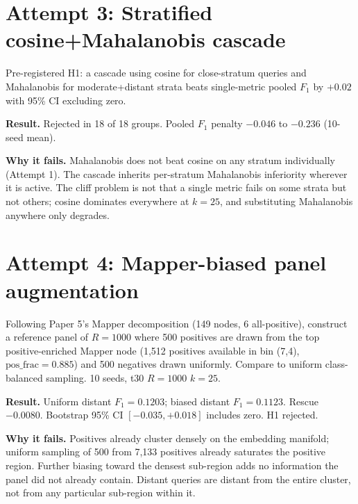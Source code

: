 \documentclass[11pt]{article}
\begin{document}
\section{Attempt 3: Stratified cosine+Mahalanobis cascade}
Pre-registered H1: a cascade using cosine for close-stratum queries and Mahalanobis for moderate+distant strata beats single-metric pooled $F_1$ by $+0.02$ with 95\% CI excluding zero.

\textbf{Result.} Rejected in 18 of 18 groups. Pooled $F_1$ penalty $-0.046$ to $-0.236$ (10-seed mean).

\textbf{Why it fails.} Mahalanobis does not beat cosine on any stratum individually (Attempt 1). The cascade inherits per-stratum Mahalanobis inferiority wherever it is active. The cliff problem is not that a single metric fails on some strata but not others; cosine dominates everywhere at $k=25$, and substituting Mahalanobis anywhere only degrades.

\section{Attempt 4: Mapper-biased panel augmentation}
Following Paper 5's Mapper decomposition (149 nodes, 6 all-positive), construct a reference panel of $R=1000$ where 500 positives are drawn from the top positive-enriched Mapper node (1{,}512 positives available in bin (7,4), $\text{pos\_frac}=0.885$) and 500 negatives drawn uniformly. Compare to uniform class-balanced sampling. 10 seeds, t30 $R=1000$ $k=25$.

\textbf{Result.} Uniform distant $F_1 = 0.1203$; biased distant $F_1 = 0.1123$. Rescue $-0.0080$. Bootstrap 95\% CI $[-0.035, +0.018]$ includes zero. H1 rejected.

\textbf{Why it fails.} Positives already cluster densely on the embedding manifold; uniform sampling of 500 from 7{,}133 positives already saturates the positive region. Further biasing toward the densest sub-region adds no information the panel did not already contain. Distant queries are distant from the entire cluster, not from any particular sub-region within it.
\end{document}
